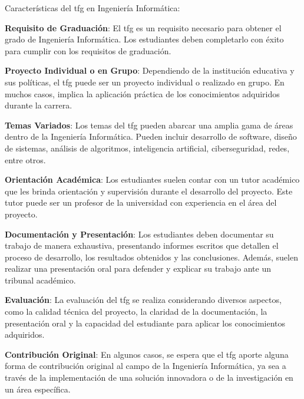 Características del \acrshort{tfg} en Ingeniería Informática:
\begin{description}

\item \textbf{Requisito de Graduación}: El \acrshort{tfg} es un requisito necesario para obtener el grado de Ingeniería Informática. Los estudiantes deben completarlo con éxito para cumplir con los requisitos de graduación.

\item \textbf{Proyecto Individual o en Grupo}: Dependiendo de la institución educativa y sus políticas, el \acrshort{tfg} puede ser un proyecto individual o realizado en grupo. En muchos casos, implica la aplicación práctica de los conocimientos adquiridos durante la carrera.

\item \textbf{Temas Variados}: Los temas del \acrshort{tfg} pueden abarcar una amplia gama de áreas dentro de la Ingeniería Informática. Pueden incluir desarrollo de software, diseño de sistemas, análisis de algoritmos, inteligencia artificial, ciberseguridad, redes, entre otros.

\item \textbf{Orientación Académica}: Los estudiantes suelen contar con un tutor académico que les brinda orientación y supervisión durante el desarrollo del proyecto. Este tutor puede ser un profesor de la universidad con experiencia en el área del proyecto.

\item \textbf{Documentación y Presentación}: Los estudiantes deben documentar su trabajo de manera exhaustiva, presentando informes escritos que detallen el proceso de desarrollo, los resultados obtenidos y las conclusiones. Además, suelen realizar una presentación oral para defender y explicar su trabajo ante un tribunal académico.

\item \textbf{Evaluación}: La evaluación del \acrshort{tfg} se realiza considerando diversos aspectos, como la calidad técnica del proyecto, la claridad de la documentación, la presentación oral y la capacidad del estudiante para aplicar los conocimientos adquiridos.

\item \textbf{Contribución Original}: En algunos casos, se espera que el \acrshort{tfg} aporte alguna forma de contribución original al campo de la Ingeniería Informática, ya sea a través de la implementación de una solución innovadora o de la investigación en un área específica.
\end{description}

